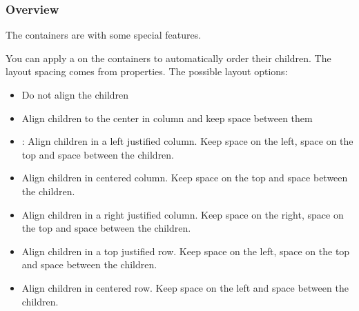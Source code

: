 \documentclass[letterpaper,10pt,english]{sphinxmanual}
\begin{document}
\subsubsection{Overview}
\label{\detokenize{object-types/cont:overview}}
The containers are  with some special features.

You can apply a  on the containers to automatically order their children. The layout spacing comes from  properties. The possible layout options:
\begin{itemize}
\item {} 
 Do not align the children

\item {} 
 Align children to the center in column and keep  space between them

\item {} 
: Align children in a left justified column. Keep  space on the left,  space on the top and  space between the children.

\item {} 
 Align children in centered column. Keep  space on the top and  space between the children.

\item {} 
 Align children in a right justified column. Keep  space on the right,  space on the top and  space between the children.

\item {} 
 Align children in a top justified row. Keep  space on the left,  space on the top and  space between the children.

\item {} 
 Align children in centered row. Keep  space on the left and  space between the children.


\end{itemize}
\end{document}
